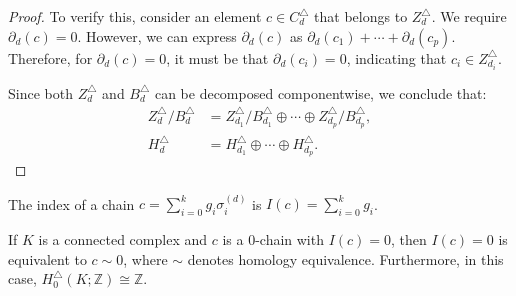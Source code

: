 \begin{proof}
	To verify this, consider an element \( c \in C^{\triangle}_{d} \) that belongs to \( Z^{\triangle}_{d} \). We require \( \partial_{d}(c) = 0 \). However, we can express \( \partial_{d}(c) \) as \( \partial_{d}(c_{1}) + \cdots + \partial_{d}(c_{p}) \). Therefore, for \( \partial_{d}(c) = 0 \), it must be that \( \partial_{d}(c_{i}) = 0 \), indicating that \( c_{i} \in Z^{\triangle}_{d_i} \).
				
	Since both \( Z^{\triangle}_{d} \) and \( B^{\triangle}_{d} \) can be decomposed componentwise, we conclude that:
	\begin{align}
		Z^{\triangle}_{d} / B^{\triangle}_{d} &= Z^{\triangle}_{d_1} / B^{\triangle}_{d_1} \oplus \cdots \oplus Z^{\triangle}_{d_p} / B^{\triangle}_{d_p}, \\
		H^{\triangle}_{d} &= H^{\triangle}_{d_1} \oplus \cdots \oplus H^{\triangle}_{d_p}. 
	\end{align}
\end{proof}

\begin{definition}[Index]
The index of a chain $c = \sum_{i=0}^{k} g_i \sigma_i^{(d)}$ is $I(c) = \sum_{i=0}^kg_i$.
\end{definition}

\begin{proposition}{\cite[Proposition 2.7]{hatcher2005algebraic}}
	\label{decomp}
	If \( K \) is a connected complex and \( c \) is a \( 0 \)-chain with \( I(c) = 0 \), then \( I(c) = 0 \) is equivalent to \( c \sim 0 \), where \( \sim \) denotes homology equivalence. Furthermore, in this case, \( H^{\triangle}_{0}(K; \mathbb{Z}) \cong \mathbb{Z} \).
\end{proposition}

